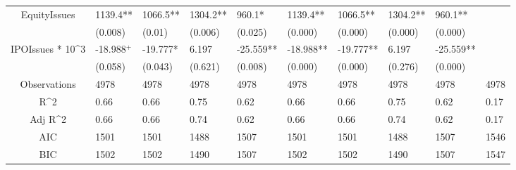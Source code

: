 \documentclass{article}
\begin{document}
\begin{table}[H]
\begin{tabular}{|clllllllll|}
  EquityIssues & 1139.4** & 1066.5** & 1304.2** & 960.1* & 1139.4** & 1066.5** & 1304.2** & 960.1** &  \\ 
   & (0.008) & (0.01) & (0.006) & (0.025) & (0.000) & (0.000) & (0.000) & (0.000) &  \\ 
  IPOIssues * 10^3 & -18.988$^{+}$ & -19.777* & 6.197 & -25.559** & -18.988** & -19.777** & 6.197 & -25.559** &  \\ 
   & (0.058) & (0.043) & (0.621) & (0.008) & (0.000) & (0.000) & (0.276) & (0.000) &  \\ 
  \hline 
 Observations & 4978 & 4978 & 4978 & 4978 & 4978 & 4978 & 4978 & 4978 & 4978 \\ 
  R^2 & 0.66 & 0.66 & 0.75 & 0.62 & 0.66 & 0.66 & 0.75 & 0.62 & 0.17 \\ 
  Adj R^2 & 0.66 & 0.66 & 0.74 & 0.62 & 0.66 & 0.66 & 0.74 & 0.62 & 0.17 \\ 
  AIC & 1501 & 1501 & 1488 & 1507 & 1501 & 1501 & 1488 & 1507 & 1546 \\ 
  BIC & 1502 & 1502 & 1490 & 1507 & 1502 & 1502 & 1490 & 1507 & 1547 \\ 
   \hline
\end{tabular}
 
\end{table}
\end{document}
